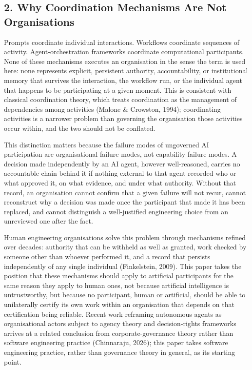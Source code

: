 \documentclass[
]{article}
\begin{document}
\hypertarget{why-coordination-mechanisms-are-not-organisations}{%
\subsection{2. Why Coordination Mechanisms Are Not
Organisations}\label{why-coordination-mechanisms-are-not-organisations}}

Prompts coordinate individual interactions. Workflows coordinate
sequences of activity. Agent-orchestration frameworks coordinate
computational participants. None of these mechanisms executes an
organisation in the sense the term is used here: none represents
explicit, persistent authority, accountability, or institutional memory
that survives the interaction, the workflow run, or the individual agent
that happens to be participating at a given moment. This is consistent
with classical coordination theory, which treats coordination as the
management of dependencies among activities (Malone \& Crowston, 1994);
coordinating activities is a narrower problem than governing the
organisation those activities occur within, and the two should not be
conflated.

This distinction matters because the failure modes of ungoverned AI
participation are organisational failure modes, not capability failure
modes. A decision made independently by an AI agent, however
well-reasoned, carries no accountable chain behind it if nothing
external to that agent recorded who or what approved it, on what
evidence, and under what authority. Without that record, an organisation
cannot confirm that a given failure will not recur, cannot reconstruct
why a decision was made once the participant that made it has been
replaced, and cannot distinguish a well-justified engineering choice
from an unreviewed one after the fact.

Human engineering organisations solve this problem through mechanisms
refined over decades: authority that can be withheld as well as granted,
work checked by someone other than whoever performed it, and a record
that persists independently of any single individual (Finkelstein,
2009). This paper takes the position that these mechanisms should apply
to artificial participants for the same reason they apply to human ones,
not because artificial intelligence is untrustworthy, but because no
participant, human or artificial, should be able to unilaterally certify
its own work within an organisation that depends on that certification
being reliable. Recent work reframing autonomous agents as
organisational actors subject to agency theory and decision-rights
frameworks arrives at a related conclusion from corporate-governance
theory rather than software engineering practice (Chinnaraju, 2026);
this paper takes software engineering practice, rather than governance
theory in general, as its starting point.
\end{document}
